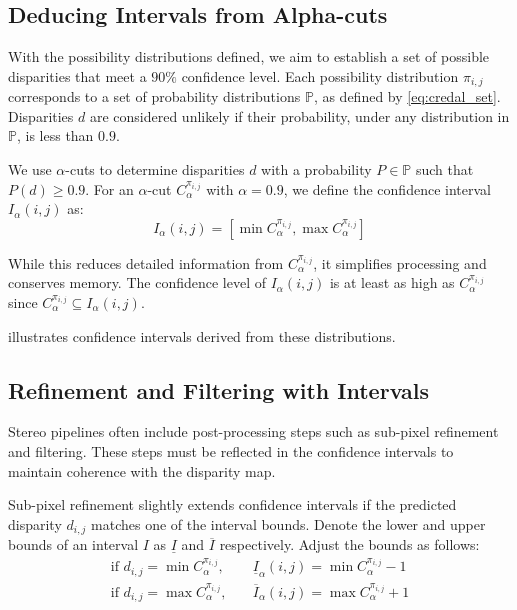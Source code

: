 \subsection{Deducing Intervals from Alpha-cuts}

With the possibility distributions defined, we aim to establish a set of possible disparities that meet a \(90\%\) confidence level. Each possibility distribution \( \pi_{i,j} \) corresponds to a set of probability distributions \(\mathbb{P}\), as defined by \cref{eq:credal_set}. Disparities \( d \) are considered unlikely if their probability, under any distribution in \( \mathbb{P} \), is less than \(0.9\).

We use \(\alpha\)-cuts to determine disparities \( d \) with a probability \( P \in \mathbb{P} \) such that \( P(d) \geq 0.9 \). For an \(\alpha\)-cut \( C^{\pi_{i,j}}_\alpha \) with \(\alpha = 0.9\), we define the confidence interval \( I_\alpha(i,j) \) as:
\begin{equation}
    I_\alpha(i,j) = [\min C^{\pi_{i,j}}_\alpha, \max C^{\pi_{i,j}}_\alpha] \label{eq:confidence_interval}
\end{equation}

While this reduces detailed information from \( C^{\pi_{i,j}}_\alpha \), it simplifies processing and conserves memory. The confidence level of \( I_\alpha(i,j) \) is at least as high as \( C^{\pi_{i,j}}_\alpha \) since \( C^{\pi_{i,j}}_\alpha \subseteq I_\alpha(i,j) \). 

 illustrates confidence intervals derived from these distributions.

\subsection{Refinement and Filtering with Intervals}

Stereo pipelines often include post-processing steps such as sub-pixel refinement and filtering. These steps must be reflected in the confidence intervals to maintain coherence with the disparity map.

Sub-pixel refinement slightly extends confidence intervals if the predicted disparity \( d_{i,j} \) matches one of the interval bounds. Denote the lower and upper bounds of an interval \( I \) as \( \underline{I} \) and \( \overline{I} \) respectively. Adjust the bounds as follows:
\begin{align}
    \text{if } d_{i,j} = \min C^{\pi_{i,j}}_\alpha, &\quad \underline{I}_\alpha(i,j) = \min C^{\pi_{i,j}}_\alpha - 1 \\
    \text{if } d_{i,j} = \max C^{\pi_{i,j}}_\alpha, &\quad \overline{I}_\alpha(i,j) = \max C^{\pi_{i,j}}_\alpha + 1
\end{align}

